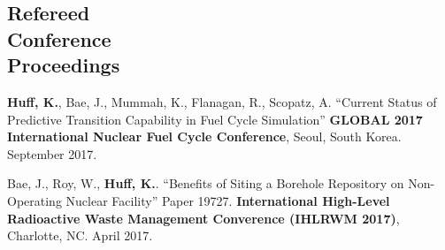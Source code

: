 \documentclass[margin,line]{resume}
\begin{document}
\begin{resume}
    \section{\mysidestyle Refereed\\Conference\\Proceedings}
    \begin{bibenum}
    \item \textbf{Huff, K.}, Bae, J., Mummah, K., Flanagan, R., Scopatz, A.
            ``Current Status of Predictive Transition Capability in Fuel Cycle 
            Simulation'' \textbf{GLOBAL 2017 International Nuclear Fuel Cycle 
            Conference}, Seoul, South Korea. September 2017.
      \item Bae, J., Roy, W., \textbf{Huff, K.}.
            ``Benefits of Siting a Borehole Repository on Non-Operating Nuclear 
            Facility'' Paper 19727.  \textbf{International High-Level Radioactive 
            Waste Management Converence (IHLRWM 2017)},
            Charlotte, NC. April 2017. 
    \end{bibenum}


\end{resume}
\end{document}
